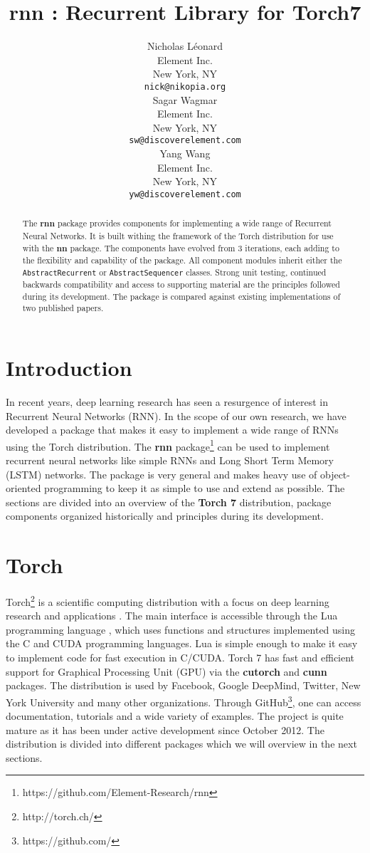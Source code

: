 \documentclass{article} %
\title{rnn : Recurrent Library for Torch7}
\author{
Nicholas L\'{e}onard \\
Element Inc.\\
New York, NY \\
\texttt{nick@nikopia.org} \\
\And
Sagar Wagmar \\
Element Inc.\\
New York, NY \\
\texttt{sw@discoverelement.com} \\
\And
Yang Wang \\
Element Inc.\\
New York, NY \\
\texttt{yw@discoverelement.com} \\
}
\providecommand{\inlinecode}[1]{\texttt{#1}}
\begin{document}
\maketitle

\begin{abstract}
The \textbf{rnn} package provides components for 
implementing a wide range of Recurrent Neural Networks.
It is built withing the framework of the Torch distribution
for use with the \textbf{nn} package.
The components have evolved from 3 iterations, each 
adding to the flexibility and capability of the package.
All component modules inherit either the \inlinecode{AbstractRecurrent}
or \inlinecode{AbstractSequencer} classes.
Strong unit testing, continued backwards compatibility and access to supporting material
are the principles followed during its development.
The package is compared against existing implementations of two published papers.
\end{abstract}

\section{Introduction}
In recent years, deep learning research has seen a resurgence of interest 
in Recurrent Neural Networks (RNN). In the scope of our own research, we
have developed a package that makes it easy to implement a wide range of RNNs using the 
Torch distribution. 
The \textbf{rnn} package\footnote{https://github.com/Element-Research/rnn} 
can be used to implement recurrent neural networks 
like simple RNNs and Long Short Term Memory (LSTM) networks.
The package is very general and makes heavy use 
of object-oriented programming to keep it as simple to use and extend as possible.
The sections are divided into an overview of the \textbf{Torch 7} distribution, 
package components organized historically and principles during its development.

\section{Torch}

Torch\footnote{http://torch.ch/} is a scientific computing distribution 
with a focus on deep learning research and applications \cite{collobert2011torch7}.
The main interface is accessible through the Lua programming language \cite{ierusalimschy1996lua},
which uses functions and structures implemented using the C and CUDA programming languages.
Lua is simple enough to make it easy to implement code for fast execution in C/CUDA. 
Torch 7 has fast and efficient support for Graphical Processing Unit (GPU)
via the \textbf{cutorch} and \textbf{cunn} packages. 
The distribution is used by Facebook, Google DeepMind, Twitter, New York University and 
many other organizations. Through GitHub\footnote{https://github.com/}, one can access documentation, tutorials and 
a wide variety of examples. The project is quite mature as it has been under active
development since October 2012. The distribution is divided into different packages 
which we will overview in the next sections.
\end{document}

